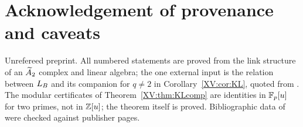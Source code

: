\section*{Acknowledgement of provenance and caveats}

Unrefereed preprint. All numbered statements are proved from the link structure of an
$\widetilde A_2$ complex and linear algebra; the one external input is the relation between $L_B$
and its companion for $q\ne2$ in Corollary~\ref{XV:cor:KL}, quoted from \cite{KL}. The
modular certificates of Theorem~\ref{XV:thm:KLcomp} are identities in $\mathbb{F}_p[u]$ for two
primes, not in $\mathbb{Z}[u]$; the theorem itself is proved. Bibliographic data of
\cite{KL,KLW,LSV} were checked against publisher pages.
